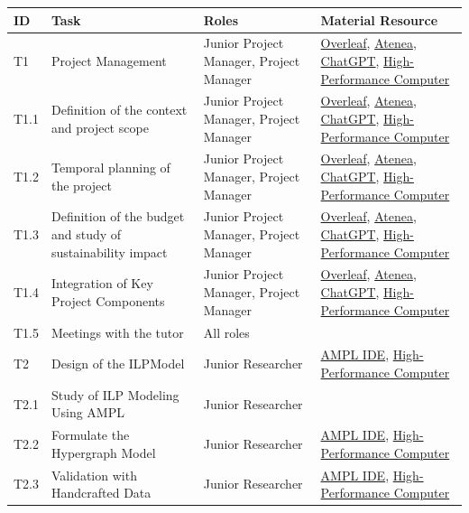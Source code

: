 \begin{landscape}
    \begin{table}[!ht]
    \centering
    \begin{tabular}{|l|l|l|l|}
        \hline
        \rowcolor{black!25}
        ID & Task & Roles  & Material Resource \\ \hline
        \rowcolor{black!15}
        T1 & Project Management & Junior Project Manager, Project Manager & \hyperlink{ht:overleaf}{Overleaf}, \hyperlink{ht:atenea}{Atenea}, \hyperlink{ht:chatgpt}{ChatGPT}, \hyperlink{ht:hpc}{High-Performance Computer} \\ \hline
        T1.1 & Definition of the context and project scope & Junior Project Manager, Project Manager & \hyperlink{ht:overleaf}{Overleaf}, \hyperlink{ht:atenea}{Atenea}, \hyperlink{ht:chatgpt}{ChatGPT}, \hyperlink{ht:hpc}{High-Performance Computer} \\ \hline
        T1.2 & Temporal planning of the project & Junior Project Manager, Project Manager & \hyperlink{ht:overleaf}{Overleaf}, \hyperlink{ht:atenea}{Atenea}, \hyperlink{ht:chatgpt}{ChatGPT}, \hyperlink{ht:hpc}{High-Performance Computer} \\ \hline
        T1.3 & Definition of the budget and study of sustainability impact & Junior Project Manager, Project Manager & \hyperlink{ht:overleaf}{Overleaf}, \hyperlink{ht:atenea}{Atenea}, \hyperlink{ht:chatgpt}{ChatGPT}, \hyperlink{ht:hpc}{High-Performance Computer} \\ \hline
        T1.4 & Integration of Key Project Components & Junior Project Manager, Project Manager & \hyperlink{ht:overleaf}{Overleaf}, \hyperlink{ht:atenea}{Atenea}, \hyperlink{ht:chatgpt}{ChatGPT}, \hyperlink{ht:hpc}{High-Performance Computer} \\ \hline
        T1.5 & Meetings with the tutor & All roles & ~ \\ \hline
        \rowcolor{black!15}
        T2 & Design of the ILPModel & Junior Researcher & \hyperlink{ht:amplide}{AMPL IDE}, \hyperlink{ht:hpc}{High-Performance Computer} \\ \hline
        T2.1 & Study of ILP Modeling Using AMPL & Junior Researcher & ~ \\ \hline
        T2.2 & Formulate the Hypergraph Model & Junior Researcher & \hyperlink{ht:amplide}{AMPL IDE}, \hyperlink{ht:hpc}{High-Performance Computer} \\ \hline
        T2.3 & Validation with Handcrafted Data & Junior Researcher & \hyperlink{ht:amplide}{AMPL IDE}, \hyperlink{ht:hpc}{High-Performance Computer} \\ \hline

\end{tabular}
\end{table}
\end{landscape}
